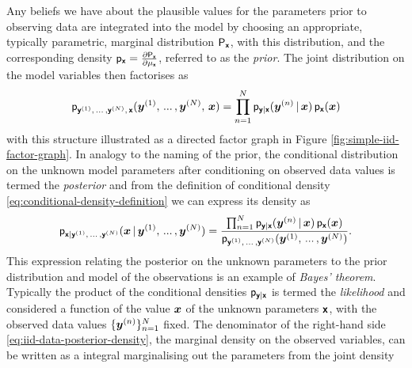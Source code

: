 Any beliefs we have about the plausible values for the parameters prior to observing data are integrated into the model by choosing an appropriate, typically parametric, marginal distribution $\mathsf{P}_{\boldsymbol{\mathsf{x}}}$, with this distribution, and the corresponding density $\mathsf{p}_{\boldsymbol{\mathsf{x}}} = \frac{\partial \mathsf{P}_{\boldsymbol{\mathsf{x}}}}{\partial \mu_{\boldsymbol{\mathsf{x}}}}$, referred to as the \emph{prior}. The joint distribution on the model variables then factorises as
\begin{equation}\label{eq:iid-data-joint-density-factorisation}
  \mathsf{p}_{\boldsymbol{\mathsf{y}}^{(1)},\,...\,,\boldsymbol{\mathsf{y}}^{(N)},\,\boldsymbol{\mathsf{x}}}(\boldsymbol{y}^{(1)},\,...\,,\boldsymbol{y}^{(N)},\,\boldsymbol{x}) =
  \prod_{n=1}^N \mathsf{p}_{\boldsymbol{\mathsf{y}}|\boldsymbol{\mathsf{x}}}(\boldsymbol{y}^{(n)}\operatorname{|}\boldsymbol{x})\,
  \mathsf{p}_{\boldsymbol{\mathsf{x}}}(\boldsymbol{x})
\end{equation}
with this structure illustrated as a directed factor graph in Figure \ref{fig:simple-iid-factor-graph}. In analogy to the naming of the prior, the conditional distribution on the unknown model parameters after conditioning on observed data values is termed the \emph{posterior} and from the definition of conditional density \eqref{eq:conditional-density-definition} we can express its density as
\begin{equation}\label{eq:iid-data-posterior-density}
  \mathsf{p}_{\boldsymbol{\mathsf{x}}|\boldsymbol{\mathsf{y}}^{(1)},\,...\,,\boldsymbol{\mathsf{y}}^{(N)}}(\boldsymbol{x} \operatorname{|} \boldsymbol{y}^{(1)},\,...\,,\boldsymbol{y}^{(N)}) =
\frac{
  \prod_{n=1}^N \mathsf{p}_{\boldsymbol{\mathsf{y}}|\boldsymbol{\mathsf{x}}}(\boldsymbol{y}^{(n)}\operatorname{|}\boldsymbol{x})\,
  \mathsf{p}_{\boldsymbol{\mathsf{x}}}(\boldsymbol{x})
}
{
 \mathsf{p}_{\boldsymbol{\mathsf{y}}^{(1)},\,...\,,\boldsymbol{\mathsf{y}}^{(N)}}(\boldsymbol{y}^{(1)},\,...\,,\boldsymbol{y}^{(N)})
}.
\end{equation}
This expression relating the posterior on the unknown parameters to the prior distribution and model of the observations is an example of \emph{Bayes' theorem}. Typically the product of the conditional densities $\mathsf{p}_{\boldsymbol{\mathsf{y}}|\boldsymbol{\mathsf{x}}}$ is termed the \emph{likelihood} and considered a function of the value $\boldsymbol{x}$ of the unknown parameters $\boldsymbol{\mathsf{x}}$, with the observed data values $\lbrace \boldsymbol{y}^{(n)} \rbrace_{n=1}^N$ fixed. The denominator of the right-hand side \eqref{eq:iid-data-posterior-density}, the marginal density on the observed variables, can be written as a integral marginalising out the parameters from the joint density
